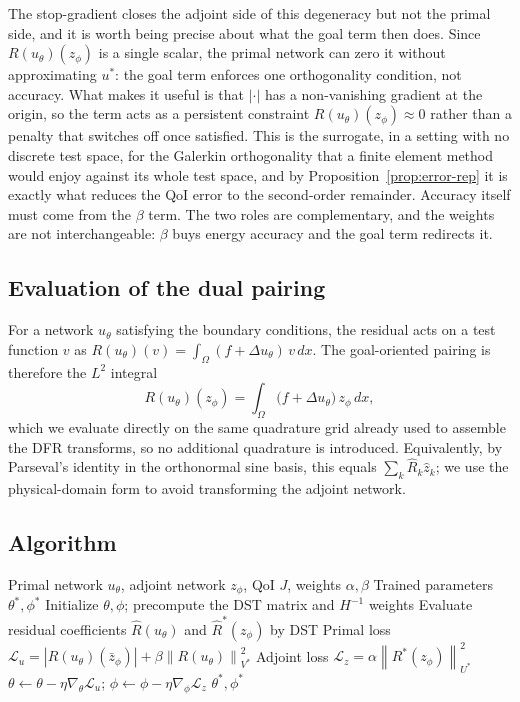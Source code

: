 \documentclass[preprint,11pt]{elsarticle}
\newcommand{\norm}[1]{\left\|#1\right\|}
\begin{document}
The stop-gradient closes the adjoint side of this degeneracy but not the primal side, and it is worth being precise about what the goal term then does. Since $R(u_\theta)(z_\phi)$ is a single scalar, the primal network can zero it without approximating $u^*$: the goal term enforces one orthogonality condition, not accuracy. What makes it useful is that $|\cdot|$ has a non-vanishing gradient at the origin, so the term acts as a persistent constraint $R(u_\theta)(z_\phi) \approx 0$ rather than a penalty that switches off once satisfied. This is the surrogate, in a setting with no discrete test space, for the Galerkin orthogonality that a finite element method would enjoy against its whole test space, and by Proposition~\ref{prop:error-rep} it is exactly what reduces the QoI error to the second-order remainder. Accuracy itself must come from the $\beta$ term. The two roles are complementary, and the weights are not interchangeable: $\beta$ buys energy accuracy and the goal term redirects it.

\subsection{Evaluation of the dual pairing}

For a network $u_\theta$ satisfying the boundary conditions, the residual acts on a test function $v$ as $R(u_\theta)(v) = \int_\Omega (f + \Delta u_\theta)\, v \, dx$. The goal-oriented pairing is therefore the $L^2$ integral
\begin{equation}
    R(u_\theta)(z_\phi) = \int_\Omega \bigl(f + \Delta u_\theta\bigr)\, z_\phi \, dx,
\end{equation}
which we evaluate directly on the same quadrature grid already used to assemble the DFR transforms, so no additional quadrature is introduced. Equivalently, by Parseval's identity in the orthonormal sine basis, this equals $\sum_k \hat{R}_k \hat{z}_k$; we use the physical-domain form to avoid transforming the adjoint network.

\subsection{Algorithm}

\begin{algorithm}
\caption{Goal-Oriented DFR}
\label{alg:method}
\begin{algorithmic}[1]
\Require Primal network $u_\theta$, adjoint network $z_\phi$, QoI $J$, weights $\alpha, \beta$
\Ensure Trained parameters $\theta^*, \phi^*$
\State Initialize $\theta, \phi$; precompute the DST matrix and $H^{-1}$ weights
    \State Evaluate residual coefficients $\hat{R}(u_\theta)$ and $\hat{R}^*(z_\phi)$ by DST
    \State Primal loss $\mathcal{L}_u = |R(u_\theta)(\bar{z}_\phi)| + \beta \norm{R(u_\theta)}_{V^*}^2$ 
    \State Adjoint loss $\mathcal{L}_z = \alpha \norm{R^*(z_\phi)}_{U^*}^2$
    \State $\theta \gets \theta - \eta \nabla_\theta \mathcal{L}_u$; \quad $\phi \gets \phi - \eta \nabla_\phi \mathcal{L}_z$
\EndFor
\State \Return $\theta^*, \phi^*$
\end{algorithmic}
\end{algorithm}
\end{document}
